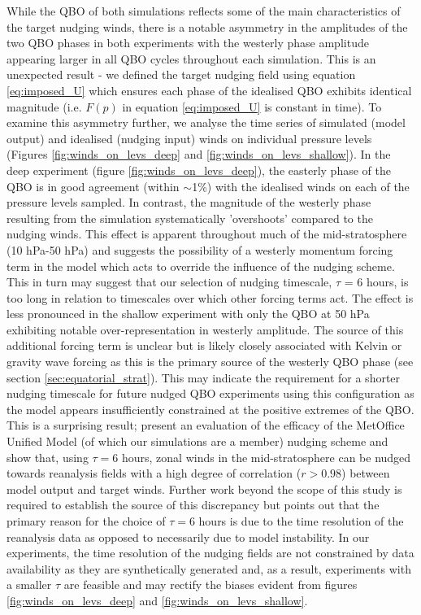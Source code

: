 While the QBO of both simulations reflects some of the main characteristics of the target nudging winds, there is a notable asymmetry in the amplitudes of the two QBO phases in both experiments with the westerly phase amplitude appearing larger in all QBO cycles throughout each simulation. This is an unexpected result - we defined the target nudging field using equation \ref{eq:imposed_U} which ensures each phase of the idealised QBO exhibits identical magnitude (i.e. $F(p)$ in equation \ref{eq:imposed_U} is constant in time). To examine this asymmetry further, we analyse the time series of simulated (model output) and idealised (nudging input) winds on individual pressure levels (Figures \ref{fig:winds_on_levs_deep} and \ref{fig:winds_on_levs_shallow}). In the deep experiment (figure \ref{fig:winds_on_levs_deep}), the easterly phase of the QBO is in good agreement (within $\sim$1\%) with the idealised winds on each of the pressure levels sampled. In contrast, the magnitude of the westerly phase resulting from the simulation systematically 'overshoots' compared to the nudging winds. This effect is apparent throughout much of the mid-stratosphere (10 hPa-50 hPa) and suggests the possibility of a westerly momentum forcing term in the model which acts to override the influence of the nudging scheme. This in turn may suggest that our selection of nudging timescale, $\tau$ = 6 hours, is too long in relation to timescales over which other forcing terms act. The effect is less pronounced in the shallow experiment with only the QBO at 50 hPa exhibiting notable over-representation in westerly amplitude. The source of this additional forcing term is unclear but is likely closely associated with Kelvin or gravity wave forcing as this is the primary source of the westerly QBO phase (see section \ref{sec:equatorial_strat}). This may indicate the requirement for a shorter nudging timescale for future nudged QBO experiments using this configuration as the model appears insufficiently constrained at the positive extremes of the QBO. This is a surprising result; \cite{telfordTechnical2008} present an evaluation of the efficacy of the MetOffice Unified Model (of which our simulations are a member) nudging scheme and show that, using $\tau = 6$ hours, zonal winds in the mid-stratosphere can be nudged towards reanalysis fields with a high degree of correlation ($r>0.98$) between model output and target winds. Further work beyond the scope of this study is required to establish the source of this discrepancy but \cite{telfordTechnical2008} points out that the primary reason for the choice of $\tau = 6$ hours is due to the time resolution of the reanalysis data as opposed to necessarily due to model instability. In our experiments, the time resolution of the nudging fields are not constrained by data availability as they are synthetically generated and, as a result, experiments with a smaller $\tau$ are feasible and may rectify the biases evident from figures \ref{fig:winds_on_levs_deep} and \ref{fig:winds_on_levs_shallow}.

